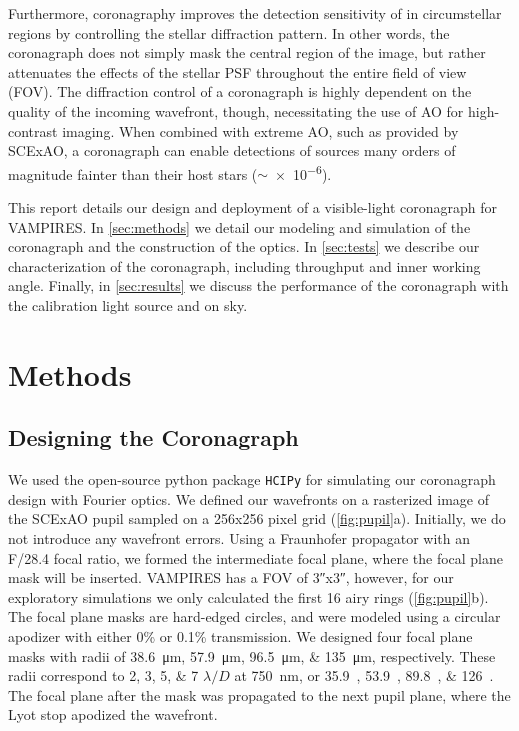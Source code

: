 \documentclass[]{spie}  %
\begin{document}
Furthermore, coronagraphy improves the detection sensitivity of in circumstellar regions by controlling the stellar diffraction pattern. In other words, the coronagraph does not simply mask the central region of the image, but rather attenuates the effects of the stellar PSF throughout the entire field of view (FOV). The diffraction control of a coronagraph is highly dependent on the quality of the incoming wavefront, though, necessitating the use of AO for high-contrast imaging. When combined with extreme AO, such as provided by SCExAO, a coronagraph can enable detections of sources many orders of magnitude fainter than their host stars ($\sim$\num{e-6})\cite{guyon2018}.

This report details our design and deployment of a visible-light coronagraph for VAMPIRES. In \autoref{sec:methods} we detail our modeling and simulation of the coronagraph and the construction of the optics. In \autoref{sec:tests} we describe our characterization of the coronagraph, including throughput and inner working angle. Finally, in \autoref{sec:results} we discuss the performance of the coronagraph with the calibration light source and on sky.

\section{Methods}\label{sec:methods}

\subsection{Designing the Coronagraph}\label{sec:design}

We used the open-source python package \texttt{HCIPy}\cite{por2018} for simulating our coronagraph design with Fourier optics. We defined our wavefronts on a rasterized image of the SCExAO pupil sampled on a 256x256 pixel grid (\autoref{fig:pupil}a). Initially, we do not introduce any wavefront errors. Using a Fraunhofer propagator with an F/28.4 focal ratio, we formed the intermediate focal plane, where the focal plane mask will be inserted. VAMPIRES has a FOV of \ang{;;3}x\ang{;;3}, however, for our exploratory simulations we only calculated the first 16 airy rings (\autoref{fig:pupil}b). The focal plane masks are hard-edged circles, and were modeled using a circular apodizer with either 0\% or 0.1\% transmission. We designed four focal plane masks with radii of \qtylist{38.6;57.9;96.5;135}{\micro\meter}, respectively. These radii correspond to \numlist{2;3;5;7} $\lambda/D$ at \qty{750}{\nano\meter}, or \qtylist{35.9;53.9;89.8;126}{\milliarcsecond}. The focal plane after the mask was propagated to the next pupil plane, where the Lyot stop apodized the wavefront.
\end{document}
